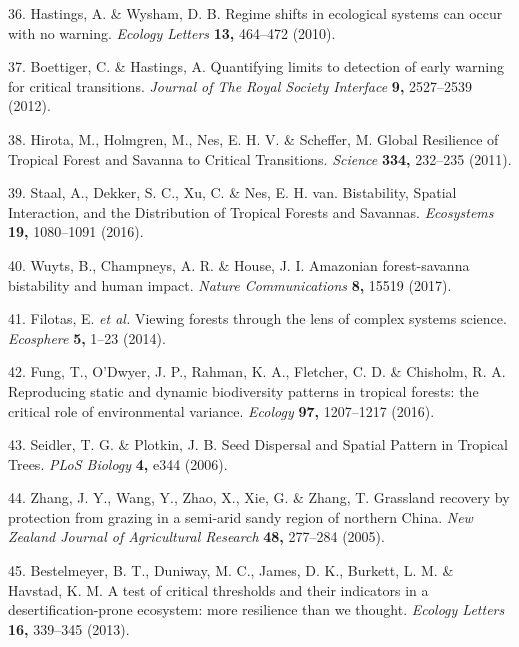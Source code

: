 \documentclass[]{article}
\begin{document}
\hypertarget{ref-Hastings2010b}{}
36. Hastings, A. \& Wysham, D. B. Regime shifts in ecological systems
can occur with no warning. \emph{Ecology Letters} \textbf{13,} 464--472
(2010).

\hypertarget{ref-Boettiger2012}{}
37. Boettiger, C. \& Hastings, A. Quantifying limits to detection of
early warning for critical transitions. \emph{Journal of The Royal
Society Interface} \textbf{9,} 2527--2539 (2012).

\hypertarget{ref-Hirota2011}{}
38. Hirota, M., Holmgren, M., Nes, E. H. V. \& Scheffer, M. Global
Resilience of Tropical Forest and Savanna to Critical Transitions.
\emph{Science} \textbf{334,} 232--235 (2011).

\hypertarget{ref-Staal2016}{}
39. Staal, A., Dekker, S. C., Xu, C. \& Nes, E. H. van. Bistability,
Spatial Interaction, and the Distribution of Tropical Forests and
Savannas. \emph{Ecosystems} \textbf{19,} 1080--1091 (2016).

\hypertarget{ref-Wuyts2017}{}
40. Wuyts, B., Champneys, A. R. \& House, J. I. Amazonian forest-savanna
bistability and human impact. \emph{Nature Communications} \textbf{8,}
15519 (2017).

\hypertarget{ref-Filotas2014}{}
41. Filotas, E. \emph{et al.} Viewing forests through the lens of
complex systems science. \emph{Ecosphere} \textbf{5,} 1--23 (2014).

\hypertarget{ref-Fung2016}{}
42. Fung, T., O'Dwyer, J. P., Rahman, K. A., Fletcher, C. D. \&
Chisholm, R. A. Reproducing static and dynamic biodiversity patterns in
tropical forests: the critical role of environmental variance.
\emph{Ecology} \textbf{97,} 1207--1217 (2016).

\hypertarget{ref-Seidler2006}{}
43. Seidler, T. G. \& Plotkin, J. B. Seed Dispersal and Spatial Pattern
in Tropical Trees. \emph{PLoS Biology} \textbf{4,} e344 (2006).

\hypertarget{ref-Zhang2005}{}
44. Zhang, J. Y., Wang, Y., Zhao, X., Xie, G. \& Zhang, T. Grassland
recovery by protection from grazing in a semi‐arid sandy region of
northern China. \emph{New Zealand Journal of Agricultural Research}
\textbf{48,} 277--284 (2005).

\hypertarget{ref-Bestelmeyer2013}{}
45. Bestelmeyer, B. T., Duniway, M. C., James, D. K., Burkett, L. M. \&
Havstad, K. M. A test of critical thresholds and their indicators in a
desertification-prone ecosystem: more resilience than we thought.
\emph{Ecology Letters} \textbf{16,} 339--345 (2013).
\end{document}
